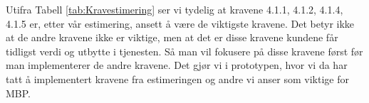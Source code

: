 Utifra Tabell \ref{tab:Kravestimering} ser vi tydelig at kravene 4.1.1, 4.1.2, 4.1.4, 4.1.5 er, etter vår estimering, ansett å være de viktigste kravene. Det betyr ikke at de andre kravene ikke er viktige, men at det er disse kravene kundene får tidligst verdi og utbytte i tjenesten. 
Så man vil fokusere på disse kravene først før man implementerer de andre kravene. Det gjør vi i prototypen, hvor vi da har tatt å implementert kravene fra estimeringen og andre vi anser som viktige for MBP.
